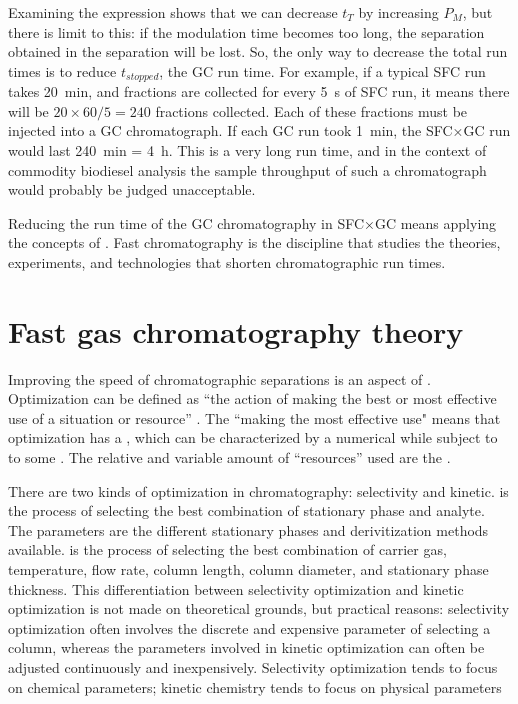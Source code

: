 Examining the expression shows that we can decrease \(t_T\) by increasing
\(P_M\), but there is limit to this: if the modulation time becomes too long,
the separation obtained in the \oneD separation will be lost. So, the only way
to decrease the total run times is to reduce \(t_{stopped}\), the GC run time.
For example, if a typical SFC run takes \SI{20}{\minute}, and fractions are
collected for every \SI{5}{\second} of SFC run, it means there will be \( 20
\times 60 / 5 = 240 \) fractions collected. Each of these fractions must be
injected into a GC chromatograph. If each GC run took \SI{1}{\minute}, the
SFC×GC run would last \SI{240}{\minute} = \SI{4}{\hour}. This is a very long
run time, and in the context of commodity biodiesel analysis the sample
throughput of such a chromatograph would probably be judged unacceptable. 

Reducing the run time of the \twoD GC chromatography in SFC×GC means applying
the concepts of . Fast chromatography is the
discipline that studies the theories, experiments, and technologies that shorten
chromatographic run times.

\section{Fast gas chromatography theory}

Improving the speed of chromatographic separations is an aspect of
. Optimization can be defined as ``the action of making
the best or most effective use of a situation or resource'' \autocite{OUP2019}.
The ``making the most effective use" means that optimization has a
, which can be characterized by a numerical 
while subject to to some . The relative and variable amount
of ``resources'' used are the .

There are two kinds of optimization in chromatography: selectivity and kinetic.
 is the process of selecting the best
combination of stationary phase and analyte. The parameters are the different
stationary phases and derivitization methods available.
 is the process of selecting the best combination
of carrier gas, temperature, flow rate, column length, column diameter, and
stationary phase thickness. This differentiation between selectivity
optimization and kinetic optimization is not made on theoretical grounds, but
practical reasons: selectivity optimization often involves the discrete and
expensive parameter of selecting a column, whereas the parameters involved in
kinetic optimization can often be adjusted continuously and inexpensively.
Selectivity optimization tends to focus on chemical parameters; kinetic
chemistry tends to focus on physical parameters

